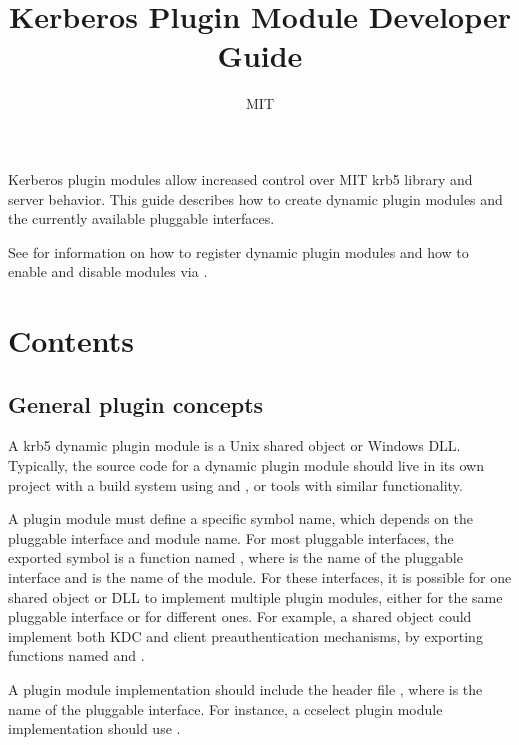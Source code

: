 \documentclass[letterpaper,10pt,english]{sphinxmanual}
\title{Kerberos Plugin Module Developer Guide}
\date{ }
\author{MIT}
\begin{document}
\pagestyle{empty}
\sphinxmaketitle
\pagestyle{plain}
\sphinxtableofcontents
\pagestyle{normal}
\label{\detokenize{plugindev/index::doc}}


\sphinxAtStartPar
Kerberos plugin modules allow increased control over MIT krb5 library
and server behavior.  This guide describes how to create dynamic
plugin modules and the currently available pluggable interfaces.

\sphinxAtStartPar
See  for information on how to register dynamic
plugin modules and how to enable and disable modules via
.


\chapter{Contents}
\label{\detokenize{plugindev/index:contents}}

\section{General plugin concepts}
\label{\detokenize{plugindev/general:general-plugin-concepts}}\label{\detokenize{plugindev/general::doc}}
\sphinxAtStartPar
A krb5 dynamic plugin module is a Unix shared object or Windows DLL.
Typically, the source code for a dynamic plugin module should live in
its own project with a build system using  and , or
tools with similar functionality.

\sphinxAtStartPar
A plugin module must define a specific symbol name, which depends on
the pluggable interface and module name.  For most pluggable
interfaces, the exported symbol is a function named
, where  is the name of the
pluggable interface and  is the name of the module.  For these
interfaces, it is possible for one shared object or DLL to implement
multiple plugin modules, either for the same pluggable interface or
for different ones.  For example, a shared object could implement both
KDC and client preauthentication mechanisms, by exporting functions
named  and .

\sphinxAtStartPar
A plugin module implementation should include the header file
, where  is the name of the
pluggable interface.  For instance, a ccselect plugin module
implementation should use .
\end{document}
